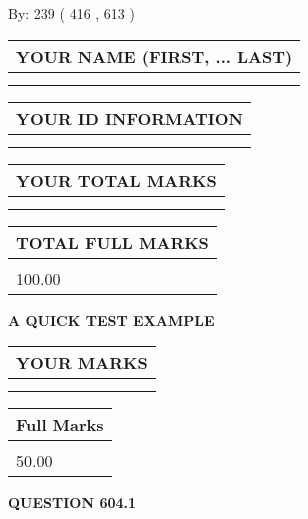 \documentclass[12pt]{article}
\begin{document}
   
\hspace{1.0in} By: 
 239 ( 416 ,  613 )
   
   
   
   
\newpage 
\setcounter{page}{ 
   604001 } 
   
   
   
   
\noindent\begin{tabular}{|l|}
\hline
YOUR NAME (FIRST, ... LAST)  \\
\hline
 \\ 
 \\ 
\hline
\end{tabular}
\hspace{0.05in} \begin{tabular}{|l|}
\hline
 YOUR   ID   INFORMATION  \\
\hline
 \\ 
 \\ 
\hline
\end{tabular}
   
   
\vspace{0.2in}\noindent\begin{tabular}{|l|}
\hline
YOUR TOTAL MARKS  \\
\hline
 \\ 
 \\ 
\hline
\end{tabular}
\hspace{0.05in} \begin{tabular}{|l|}
\hline
TOTAL FULL MARKS  \\
\hline
 \\ 
100.00 \\
\hline
\end{tabular}
   
   
 \vspace{0.2in}
{\LARGE {\textbf{ A QUICK TEST EXAMPLE}}}
   
   
  
\vspace{0.2in}
  
\noindent\begin{tabular}{|l|}
\hline
 YOUR MARKS  \\
\hline
 \\ 
 \\ 
\hline
\end{tabular}
\hspace{0.05in} \begin{tabular}{|l|}
\hline
 Full Marks  \\
\hline
 \\ 
50.00 \\
\hline
\end{tabular}
{\textbf{\Large{QUESTION
604.1 
}}}
  
\end{document}
